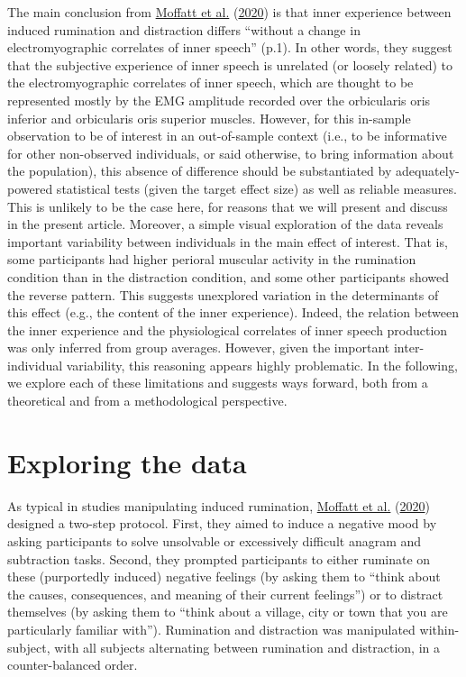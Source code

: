 \documentclass[
  english,
  man, donotrepeattitle,floatsintext]{apa6}
\begin{document}
The main conclusion from \protect\hyperlink{ref-moffatt_inner_2020}{Moffatt et al.} (\protect\hyperlink{ref-moffatt_inner_2020}{2020}) is that inner experience between induced rumination and distraction differs ``without a change in electromyographic correlates of inner speech'' (p.1). In other words, they suggest that the subjective experience of inner speech is unrelated (or loosely related) to the electromyographic correlates of inner speech, which are thought to be represented mostly by the EMG amplitude recorded over the orbicularis oris inferior and orbicularis oris superior muscles. However, for this in-sample observation to be of interest in an out-of-sample context (i.e., to be informative for other non-observed individuals, or said otherwise, to bring information about the population), this absence of difference should be substantiated by adequately-powered statistical tests (given the target effect size) as well as reliable measures. This is unlikely to be the case here, for reasons that we will present and discuss in the present article. Moreover, a simple visual exploration of the data reveals important variability between individuals in the main effect of interest. That is, some participants had higher perioral muscular activity in the rumination condition than in the distraction condition, and some other participants showed the reverse pattern. This suggests unexplored variation in the determinants of this effect (e.g., the content of the inner experience). Indeed, the relation between the inner experience and the physiological correlates of inner speech production was only inferred from group averages. However, given the important inter-individual variability, this reasoning appears highly problematic. In the following, we explore each of these limitations and suggests ways forward, both from a theoretical and from a methodological perspective.

\hypertarget{exploring-the-data}{%
\section{Exploring the data}\label{exploring-the-data}}

As typical in studies manipulating induced rumination, \protect\hyperlink{ref-moffatt_inner_2020}{Moffatt et al.} (\protect\hyperlink{ref-moffatt_inner_2020}{2020}) designed a two-step protocol. First, they aimed to induce a negative mood by asking participants to solve unsolvable or excessively difficult anagram and subtraction tasks. Second, they prompted participants to either ruminate on these (purportedly induced) negative feelings (by asking them to ``think about the causes, consequences, and meaning of their current feelings'') or to distract themselves (by asking them to ``think about a village, city or town that you are particularly familiar with''). Rumination and distraction was manipulated within-subject, with all subjects alternating between rumination and distraction, in a counter-balanced order.
\end{document}
